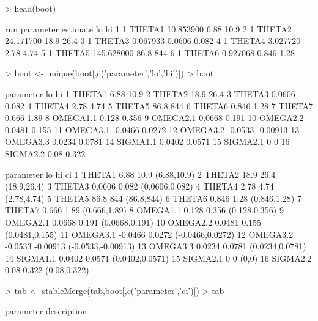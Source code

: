 \begin{Schunk}
\begin{Sinput}
> head(boot)
\end{Sinput}
\begin{Soutput}
  run parameter   estimate     lo    hi
1   1    THETA1  10.853900   6.88  10.9
2   1    THETA2  24.171700   18.9  26.4
3   1    THETA3   0.067933 0.0606 0.082
4   1    THETA4   3.027720   2.78  4.74
5   1    THETA5 145.628000   86.8   844
6   1    THETA6   0.927068  0.846  1.28
\end{Soutput}
\begin{Sinput}
> boot <- unique(boot[,c('parameter','lo','hi')])
> boot
\end{Sinput}
\begin{Soutput}
   parameter      lo       hi
1     THETA1    6.88     10.9
2     THETA2    18.9     26.4
3     THETA3  0.0606    0.082
4     THETA4    2.78     4.74
5     THETA5    86.8      844
6     THETA6   0.846     1.28
7     THETA7   0.666     1.89
8   OMEGA1.1   0.128    0.356
9   OMEGA2.1  0.0668    0.191
10  OMEGA2.2  0.0481    0.155
11  OMEGA3.1 -0.0466   0.0272
12  OMEGA3.2 -0.0533 -0.00913
13  OMEGA3.3  0.0234   0.0781
14  SIGMA1.1  0.0402   0.0571
15  SIGMA2.1       0        0
16  SIGMA2.2    0.08    0.322
\end{Soutput}
\begin{Soutput}
   parameter      lo       hi                 ci
1     THETA1    6.88     10.9        (6.88,10.9)
2     THETA2    18.9     26.4        (18.9,26.4)
3     THETA3  0.0606    0.082     (0.0606,0.082)
4     THETA4    2.78     4.74        (2.78,4.74)
5     THETA5    86.8      844         (86.8,844)
6     THETA6   0.846     1.28       (0.846,1.28)
7     THETA7   0.666     1.89       (0.666,1.89)
8   OMEGA1.1   0.128    0.356      (0.128,0.356)
9   OMEGA2.1  0.0668    0.191     (0.0668,0.191)
10  OMEGA2.2  0.0481    0.155     (0.0481,0.155)
11  OMEGA3.1 -0.0466   0.0272   (-0.0466,0.0272)
12  OMEGA3.2 -0.0533 -0.00913 (-0.0533,-0.00913)
13  OMEGA3.3  0.0234   0.0781    (0.0234,0.0781)
14  SIGMA1.1  0.0402   0.0571    (0.0402,0.0571)
15  SIGMA2.1       0        0              (0,0)
16  SIGMA2.2    0.08    0.322       (0.08,0.322)
\end{Soutput}
\begin{Sinput}
> tab <- stableMerge(tab,boot[,c('parameter','ci')])
> tab
\end{Sinput}
\begin{Soutput}
   parameter                                   description

\end{Soutput}
\end{Schunk}

